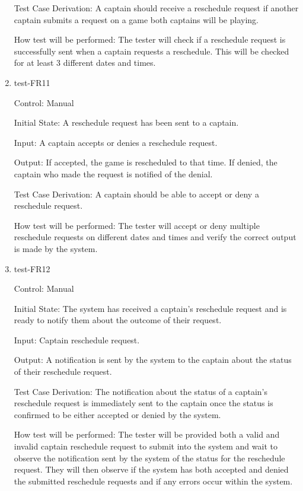 \documentclass[12pt, titlepage]{article}
\begin{document}
\begin{enumerate}
  Test Case Derivation: A captain should receive a reschedule request if another
  captain submits a request on a game both captains will be playing.

  How test will be performed: The tester will check if a reschedule request is
  successfully sent when a captain requests a reschedule. This will be checked
  for at least 3 different dates and times.

  \item{test-FR11\\}

  Control: Manual

  Initial State: A reschedule request has been sent to a captain.
            
  Input: A captain accepts or denies a reschedule request.

  Output: If accepted, the game is rescheduled to that time. If denied, the
  captain who made the request is notified of the denial.

  Test Case Derivation: A captain should be able to accept or deny a reschedule
  request.

  How test will be performed: The tester will accept or deny multiple reschedule
  requests on different dates and times and verify the correct output is made by
  the system.

  \item{test-FR12\\}

  Control: Manual
            
  Initial State: The system has received a captain's reschedule request and is ready to
  notify them about the outcome of their request.
            
  Input: Captain reschedule request.
            
  Output: A notification is sent by the system to the captain about the status of their
  reschedule request.

  Test Case Derivation: The notification about the status of a captain's reschedule
  request is immediately sent to the captain once the status is confirmed to be either
  accepted or denied by the system.
            
  How test will be performed: The tester will be provided both a valid and invalid captain
  reschedule request to submit into the system and wait to observe the notification sent
  by the system of the status for the reschedule request. They will then observe if the
  system has both accepted and denied the submitted reschedule requests and if any errors
  occur within the system. 

\end{enumerate}
\end{document}

